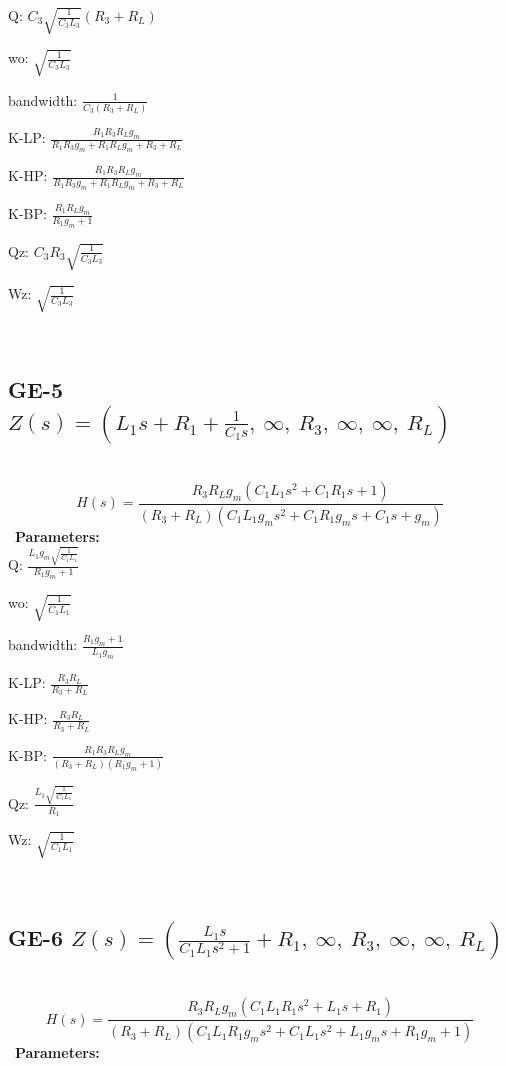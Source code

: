 \documentclass{article}
\begin{document}
Q: $C_{3} \sqrt{\frac{1}{C_{3} L_{3}}} \left(R_{3} + R_{L}\right)$\ 

wo: $\sqrt{\frac{1}{C_{3} L_{3}}}$\ 

bandwidth: $\frac{1}{C_{3} \left(R_{3} + R_{L}\right)}$\ 

K-LP: $\frac{R_{1} R_{3} R_{L} g_{m}}{R_{1} R_{3} g_{m} + R_{1} R_{L} g_{m} + R_{3} + R_{L}}$\ 

K-HP: $\frac{R_{1} R_{3} R_{L} g_{m}}{R_{1} R_{3} g_{m} + R_{1} R_{L} g_{m} + R_{3} + R_{L}}$\ 

K-BP: $\frac{R_{1} R_{L} g_{m}}{R_{1} g_{m} + 1}$\ 

Qz: $C_{3} R_{3} \sqrt{\frac{1}{C_{3} L_{3}}}$\ 

Wz: $\sqrt{\frac{1}{C_{3} L_{3}}}$\ 

\ 

\subsection{GE-5 $Z(s) = \left( L_{1} s + R_{1} + \frac{1}{C_{1} s}, \  \infty, \  R_{3}, \  \infty, \  \infty, \  R_{L}\right)$ } \ 
\textbf{\[H(s) = \frac{R_{3} R_{L} g_{m} \left(C_{1} L_{1} s^{2} + C_{1} R_{1} s + 1\right)}{\left(R_{3} + R_{L}\right) \left(C_{1} L_{1} g_{m} s^{2} + C_{1} R_{1} g_{m} s + C_{1} s + g_{m}\right)}\] } \ 
\textbf{Parameters:}\\ 

Q: $\frac{L_{1} g_{m} \sqrt{\frac{1}{C_{1} L_{1}}}}{R_{1} g_{m} + 1}$\ 

wo: $\sqrt{\frac{1}{C_{1} L_{1}}}$\ 

bandwidth: $\frac{R_{1} g_{m} + 1}{L_{1} g_{m}}$\ 

K-LP: $\frac{R_{3} R_{L}}{R_{3} + R_{L}}$\ 

K-HP: $\frac{R_{3} R_{L}}{R_{3} + R_{L}}$\ 

K-BP: $\frac{R_{1} R_{3} R_{L} g_{m}}{\left(R_{3} + R_{L}\right) \left(R_{1} g_{m} + 1\right)}$\ 

Qz: $\frac{L_{1} \sqrt{\frac{1}{C_{1} L_{1}}}}{R_{1}}$\ 

Wz: $\sqrt{\frac{1}{C_{1} L_{1}}}$\ 

\ 

\subsection{GE-6 $Z(s) = \left( \frac{L_{1} s}{C_{1} L_{1} s^{2} + 1} + R_{1}, \  \infty, \  R_{3}, \  \infty, \  \infty, \  R_{L}\right)$ } \ 
\textbf{\[H(s) = \frac{R_{3} R_{L} g_{m} \left(C_{1} L_{1} R_{1} s^{2} + L_{1} s + R_{1}\right)}{\left(R_{3} + R_{L}\right) \left(C_{1} L_{1} R_{1} g_{m} s^{2} + C_{1} L_{1} s^{2} + L_{1} g_{m} s + R_{1} g_{m} + 1\right)}\] } \ 
\textbf{Parameters:}\\ 
\end{document}
